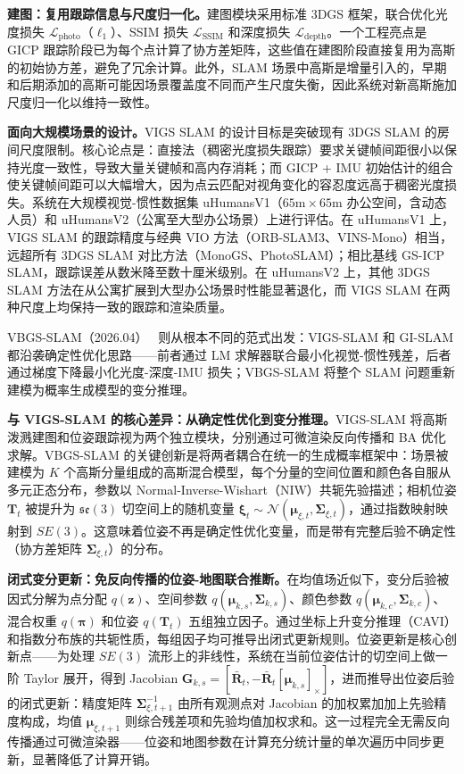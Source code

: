 \textbf{建图：复用跟踪信息与尺度归一化。}建图模块采用标准 3DGS 框架，联合优化光度损失 $\mathcal{L}_{\mathrm{photo}}$（$\ell_1$）、SSIM 损失 $\mathcal{L}_{\mathrm{SSIM}}$ 和深度损失 $\mathcal{L}_{\mathrm{depth}}$。一个工程亮点是 GICP 跟踪阶段已为每个点计算了协方差矩阵，这些值在建图阶段直接复用为高斯的初始协方差，避免了冗余计算。此外，SLAM 场景中高斯是增量引入的，早期和后期添加的高斯可能因场景覆盖度不同而产生尺度失衡，因此系统对新高斯施加尺度归一化以维持一致性。

\textbf{面向大规模场景的设计。}VIGS SLAM 的设计目标是突破现有 3DGS SLAM 的房间尺度限制。核心论点是：直接法（稠密光度损失跟踪）要求关键帧间距很小以保持光度一致性，导致大量关键帧和高内存消耗；而 GICP + IMU 初始估计的组合使关键帧间距可以大幅增大，因为点云匹配对视角变化的容忍度远高于稠密光度损失。系统在大规模视觉-惯性数据集 uHumansV1（$65\text{m} \times 65\text{m}$ 办公空间，含动态人员）和 uHumansV2（公寓至大型办公场景）上进行评估。在 uHumansV1 上，VIGS SLAM 的跟踪精度与经典 VIO 方法（ORB-SLAM3、VINS-Mono）相当，远超所有 3DGS SLAM 对比方法（MonoGS、PhotoSLAM）；相比基线 GS-ICP SLAM，跟踪误差从数米降至数十厘米级别。在 uHumansV2 上，其他 3DGS SLAM 方法在从公寓扩展到大型办公场景时性能显著退化，而 VIGS SLAM 在两种尺度上均保持一致的跟踪和渲染质量。

VBGS-SLAM（2026.04）~\cite{2604_02696} 则从根本不同的范式出发：VIGS-SLAM 和 GI-SLAM 都沿袭确定性优化思路——前者通过 LM 求解器联合最小化视觉-惯性残差，后者通过梯度下降最小化光度-深度-IMU 损失；VBGS-SLAM 将整个 SLAM 问题重新建模为概率生成模型的变分推理。

\textbf{与 VIGS-SLAM 的核心差异：从确定性优化到变分推理。}VIGS-SLAM 将高斯泼溅建图和位姿跟踪视为两个独立模块，分别通过可微渲染反向传播和 BA 优化求解。VBGS-SLAM 的关键创新是将两者耦合在统一的生成概率框架中：场景被建模为 $K$ 个高斯分量组成的高斯混合模型，每个分量的空间位置和颜色各自服从多元正态分布，参数以 Normal-Inverse-Wishart（NIW）共轭先验描述；相机位姿 $\mathbf{T}_t$ 被提升为 $\mathfrak{se}(3)$ 切空间上的随机变量 $\boldsymbol{\xi}_t \sim \mathcal{N}(\boldsymbol{\mu}_{\xi,t}, \boldsymbol{\Sigma}_{\xi,t})$，通过指数映射映射到 $SE(3)$。这意味着位姿不再是确定性优化变量，而是带有完整后验不确定性（协方差矩阵 $\boldsymbol{\Sigma}_{\xi,t}$）的分布。

\textbf{闭式变分更新：免反向传播的位姿-地图联合推断。}在均值场近似下，变分后验被因式分解为点分配 $q(\mathbf{z})$、空间参数 $q(\boldsymbol{\mu}_{k,s}, \boldsymbol{\Sigma}_{k,s})$、颜色参数 $q(\boldsymbol{\mu}_{k,c}, \boldsymbol{\Sigma}_{k,c})$、混合权重 $q(\boldsymbol{\pi})$ 和位姿 $q(\mathbf{T}_t)$ 五组独立因子。通过坐标上升变分推理（CAVI）和指数分布族的共轭性质，每组因子均可推导出闭式更新规则。位姿更新是核心创新点——为处理 $SE(3)$ 流形上的非线性，系统在当前位姿估计的切空间上做一阶 Taylor 展开，得到 Jacobian $\mathbf{G}_{k,s} = [\bar{\mathbf{R}}_t, -\bar{\mathbf{R}}_t[\boldsymbol{\mu}_{k,s}]_\times]$，进而推导出位姿后验的闭式更新：精度矩阵 $\boldsymbol{\Sigma}_{\xi,t+1}^{-1}$ 由所有观测点对 Jacobian 的加权累加加上先验精度构成，均值 $\boldsymbol{\mu}_{\xi,t+1}$ 则综合残差项和先验均值加权求和。这一过程完全无需反向传播通过可微渲染器——位姿和地图参数在计算充分统计量的单次遍历中同步更新，显著降低了计算开销。

